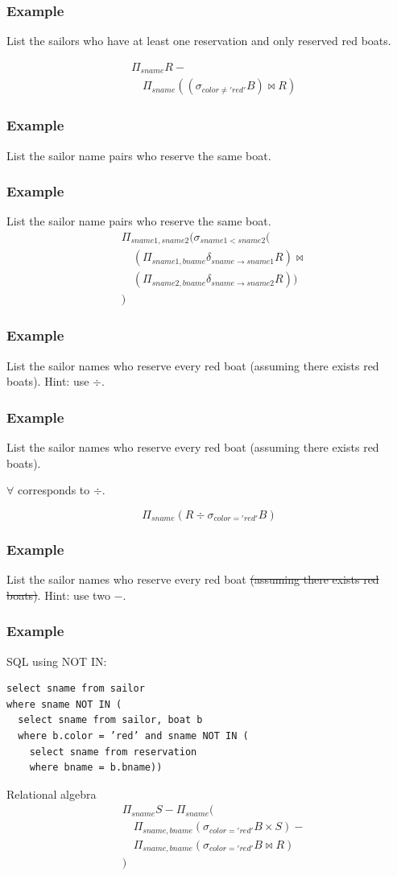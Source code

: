 \documentclass{beamer}
\begin{document}
\begin{frame}
\frametitle{Example}
List the sailors who have at least one reservation and only reserved red boats.  

\begin{align*}
& \Pi_{sname} R - \\
& \quad \Pi_{sname} ((\sigma_{color\neq 'red'} B) \bowtie R)
\end{align*}


\end{frame}

\begin{frame}
\frametitle{Example}
List the sailor name pairs who reserve the same boat. 
\end{frame}

\begin{frame}
\frametitle{Example}
List the sailor name pairs who reserve the same boat. 
\begin{align*}
& \Pi_{sname1, sname2} (\sigma_{sname1<sname2 }( \\
&\quad (\Pi_{sname1, bname} \delta_{sname \rightarrow sname1}R)\bowtie \\
&\quad (\Pi_{sname2, bname} \delta_{sname \rightarrow sname2}R))\\
&)
\end{align*}
\end{frame}

\begin{frame}
\frametitle{Example}
List the sailor names who reserve every red boat (assuming there exists red boats). Hint: use $\div$. 
\end{frame}

\begin{frame}
\frametitle{Example}
List the sailor names who reserve every red boat (assuming there exists red boats).

$\forall$ corresponds to $\div$.


$$
\Pi_{sname} (R\div \sigma_{color='red'} B)
$$
\end{frame}


\begin{frame}
\frametitle{Example}
List the sailor names who reserve every red boat \st{(assuming there exists red boats)}.
Hint: use two $-$. 
\end{frame}

\begin{frame}[fragile]
\frametitle{Example}
SQL using NOT IN:
\begin{verbatim}
select sname from sailor
where sname NOT IN (
  select sname from sailor, boat b 
  where b.color = ’red’ and sname NOT IN (
    select sname from reservation
    where bname = b.bname))
\end{verbatim}
Relational algebra
\begin{align*}
& \Pi_{sname} S - \Pi_{sname}(\\
& \quad \Pi_{sname, bname}(\sigma_{color='red'} B \times S)-\\
& \quad \Pi_{sname, bname} (\sigma_{color='red'} B \bowtie R)\\
&)
\end{align*}
\end{frame}
\end{document}
